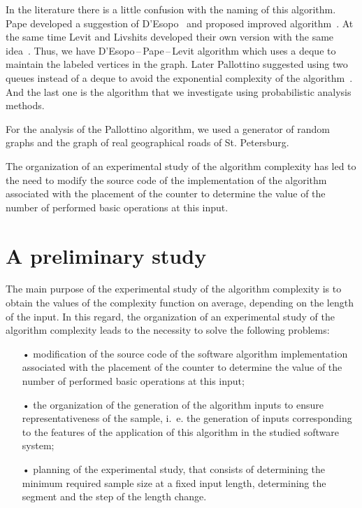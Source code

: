 \documentclass[a4paper]{article}
\begin{document}
In the literature there is a little confusion with the naming of this algorithm. Pape developed a suggestion of D’Esopo~\cite{desopo} and proposed improved algorithm~\cite{pape}. At the same time Levit and Livshits developed their own version with the same idea~\cite{levit_livshits}. Thus, we have D’Esopo\,--\,Pape\,--\,Levit algorithm which uses a deque to maintain the labeled vertices in the graph. Later Pallottino suggested using two queues instead of a deque to avoid the exponential complexity of the algorithm~\cite{pallottino}. And the last one is the algorithm that we investigate using probabilistic analysis methods.

For the analysis of the Pallottino algorithm, we used a generator of random graphs and the graph of real geographical roads of St. Petersburg.

The organization of an experimental study of the algorithm complexity has led to the need to modify the source code of the implementation of the algorithm associated with the placement of the counter to determine the value of the number of performed basic operations at this input.

\section{A preliminary study} \label{sec:analysis_part_1}

The main purpose of the experimental study of the algorithm complexity is to obtain the values of the complexity function on average, depending on the length of the input. In this regard, the organization of an experimental study of the algorithm complexity leads to the necessity to solve the following problems:

\begin{enumerate}
	\item[•] modification of the source code of the software algorithm implementation associated with the placement of the counter to determine the value of the number of performed basic operations at this input;
	\item[•] the organization of the generation of the algorithm inputs to ensure representativeness of the sample, i.~e. the generation of inputs corresponding to the features of the application of this algorithm in the studied software system;
	\item[•] planning of the experimental study, that consists of determining the minimum required sample size at a fixed input length, determining the segment and the step of the length change.
\end{enumerate}
\end{document}

